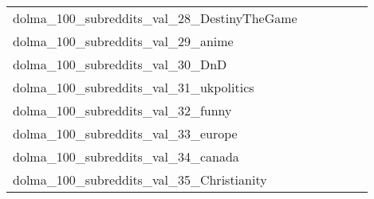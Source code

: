 {\begin{longtable}{m{6cm}m{1.7cm}m{1.7cm}m{1.7cm}m{1.7cm}m{1.7cm}}
	dolma\_100\_subreddits\_val\_28\_DestinyTheGame  & \colorbox[HTML]{ffffe5}{\makebox[\mywidth][c]{35.27}} & \colorbox[HTML]{bae294}{\makebox[\mywidth][c]{33.58}} & \colorbox[HTML]{ffffe5}{\makebox[\mywidth][c]{36.13}} & \colorbox[HTML]{dff2a7}{\makebox[\mywidth][c]{33.78}} & \colorbox[HTML]{77c578}{\makebox[\mywidth][c]{33.37}}\\
	dolma\_100\_subreddits\_val\_29\_anime  & \colorbox[HTML]{ffffe5}{\makebox[\mywidth][c]{23.21}} & \colorbox[HTML]{e3f4aa}{\makebox[\mywidth][c]{22.04}} & \colorbox[HTML]{ffffe5}{\makebox[\mywidth][c]{23.46}} & \colorbox[HTML]{eff8b3}{\makebox[\mywidth][c]{22.12}} & \colorbox[HTML]{77c578}{\makebox[\mywidth][c]{21.77}}\\
	dolma\_100\_subreddits\_val\_30\_DnD  & \colorbox[HTML]{ffffe5}{\makebox[\mywidth][c]{28.22}} & \colorbox[HTML]{daf0a4}{\makebox[\mywidth][c]{26.71}} & \colorbox[HTML]{ffffe5}{\makebox[\mywidth][c]{28.78}} & \colorbox[HTML]{dcf1a5}{\makebox[\mywidth][c]{26.72}} & \colorbox[HTML]{77c578}{\makebox[\mywidth][c]{26.39}}\\
	dolma\_100\_subreddits\_val\_31\_ukpolitics  & \colorbox[HTML]{ffffe5}{\makebox[\mywidth][c]{22.35}} & \colorbox[HTML]{a9db8c}{\makebox[\mywidth][c]{21.19}} & \colorbox[HTML]{ffffe5}{\makebox[\mywidth][c]{22.80}} & \colorbox[HTML]{d4eea0}{\makebox[\mywidth][c]{21.31}} & \colorbox[HTML]{77c578}{\makebox[\mywidth][c]{21.10}}\\
	dolma\_100\_subreddits\_val\_32\_funny  & \colorbox[HTML]{ffffe5}{\makebox[\mywidth][c]{20.78}} & \colorbox[HTML]{dcf1a5}{\makebox[\mywidth][c]{19.45}} & \colorbox[HTML]{ffffe5}{\makebox[\mywidth][c]{20.70}} & \colorbox[HTML]{ceeb9e}{\makebox[\mywidth][c]{19.40}} & \colorbox[HTML]{77c578}{\makebox[\mywidth][c]{19.23}}\\
	dolma\_100\_subreddits\_val\_33\_europe  & \colorbox[HTML]{ffffe5}{\makebox[\mywidth][c]{21.76}} & \colorbox[HTML]{a2d889}{\makebox[\mywidth][c]{20.59}} & \colorbox[HTML]{ffffe5}{\makebox[\mywidth][c]{22.10}} & \colorbox[HTML]{d5eea1}{\makebox[\mywidth][c]{20.72}} & \colorbox[HTML]{77c578}{\makebox[\mywidth][c]{20.52}}\\
	dolma\_100\_subreddits\_val\_34\_canada  & \colorbox[HTML]{ffffe5}{\makebox[\mywidth][c]{22.44}} & \colorbox[HTML]{c2e698}{\makebox[\mywidth][c]{21.21}} & \colorbox[HTML]{ffffe5}{\makebox[\mywidth][c]{22.44}} & \colorbox[HTML]{e2f3a9}{\makebox[\mywidth][c]{21.30}} & \colorbox[HTML]{77c578}{\makebox[\mywidth][c]{21.09}}\\
	dolma\_100\_subreddits\_val\_35\_Christianity  & \colorbox[HTML]{ffffe5}{\makebox[\mywidth][c]{17.88}} & \colorbox[HTML]{b7e193}{\makebox[\mywidth][c]{17.02}} & \colorbox[HTML]{ffffe5}{\makebox[\mywidth][c]{18.10}} & \colorbox[HTML]{c2e698}{\makebox[\mywidth][c]{17.04}} & \colorbox[HTML]{77c578}{\makebox[\mywidth][c]{16.94}}\\

\end{longtable}}

